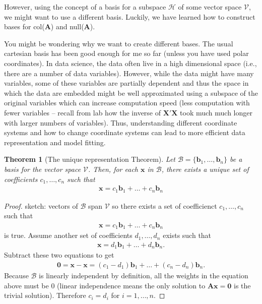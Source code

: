 \documentclass[
]{book}
\newtheorem{theorem}{Theorem}[chapter]
\theoremstyle{definition}
\theoremstyle{definition}
\theoremstyle{definition}
\theoremstyle{definition}
\theoremstyle{remark}
\begin{document}
However, using the concept of a basis for a subspace \(\mathcal{H}\) of some vector space \(\mathcal{V}\), we might want to use a different basis. Luckily, we have learned how to construct bases for col(\(\mathbf{A}\)) and null(\(\mathbf{A}\)).

You might be wondering why we want to create different bases. The usual cartesian basis has been good enough for me so far (unless you have used polar coordinates). In data science, the data often live in a high dimensional space (i.e., there are a number of data variables). However, while the data might have many variables, some of these variables are partially dependent and thus the space in which the data are embedded might be well approximated using a subspace of the original variables which can increase computation speed (less computation with fewer variables -- recall from lab how the inverse of \(\mathbf{X}'\mathbf{X}\) took much much longer with larger numbers of variables). Thus, understanding different coordinate systems and how to change coordinate systems can lead to more efficient data representation and model fitting.

\begin{theorem}[The unique representation Theorem]
Let \(\mathcal{B} = \{ \mathbf{b}_1, \ldots, \mathbf{b}_n \}\) be a basis for the vector space \(\mathcal{V}\). Then, for each \(\mathbf{x}\) in \(\mathcal{B}\), there exists a unique set of coefficients \(c_1, \ldots, c_n\) such that
\[
\begin{aligned}
\mathbf{x} = c_1 \mathbf{b}_1 + \ldots + c_n \mathbf{b}_n
\end{aligned}
\]
\end{theorem}

\begin{proof}
sketch: vectors of \(\mathcal{B}\) span \(\mathcal{V}\) so there exists a set of coefficienct \(c_1, \ldots, c_n\) such that
\[
\begin{aligned}
\mathbf{x} = c_1 \mathbf{b}_1 + \ldots + c_n \mathbf{b}_n
\end{aligned}
\]
is true. Assume another set of coefficients \(d_1, \ldots, d_n\) exists such that
\[
\begin{aligned}
\mathbf{x} = d_1 \mathbf{b}_1 + \ldots + d_n \mathbf{b}_n.
\end{aligned}
\]
Subtract these two equations to get
\[
\begin{aligned}
\mathbf{0} = \mathbf{x} - \mathbf{x} = (c_1 - d_1) \mathbf{b}_1 + \ldots + (c_n - d_n) \mathbf{b}_n.
\end{aligned}
\]
Because \(\mathcal{B}\) is linearly independent by definition, all the weights in the equation above must be 0 (linear independence means the only solution to \(\mathbf{A}\mathbf{x} = \mathbf{0}\) is the trivial solution). Therefore \(c_i = d_i\) for \(i = 1, \ldots, n\).
\end{proof}
\end{document}
